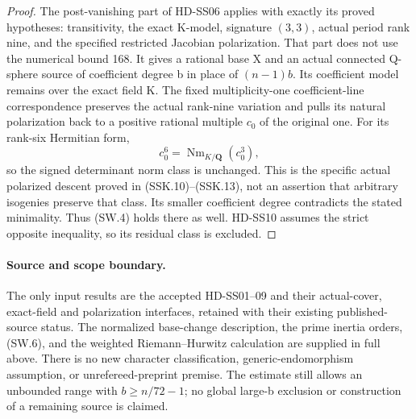 \begin{proof}
The post-vanishing part of HD-SS06 applies with exactly its proved
hypotheses: transitivity, the exact K-model, signature \((3,3)\),
actual period rank nine, and the specified restricted Jacobian
polarization.  That part does not use the numerical bound 168.
It gives a rational base X and an actual connected Q-sphere source
of coefficient degree b in place of \((n-1)b\).  Its coefficient
model remains over the exact field K.  The fixed multiplicity-one
coefficient-line correspondence preserves the actual rank-nine
variation and pulls its natural polarization back to a positive
rational multiple \(c_0\) of the original one.  For its rank-six
Hermitian form,
\[
                  c_0^6=\operatorname{Nm}_{K/\mathbf Q}(c_0^3),
 \tag{SW.9}
\]
so the signed determinant norm class is unchanged.  This is the
specific actual polarized descent proved in (SSK.10)--(SSK.13),
not an assertion that arbitrary isogenies preserve that class.
Its smaller coefficient degree contradicts the stated minimality.
Thus (SW.4) holds there as well.  HD-SS10 assumes the strict
opposite inequality, so its residual class is excluded.
\end{proof}

\paragraph{Source and scope boundary.}
The only input results are the accepted HD-SS01--09 and their
actual-cover, exact-field and polarization interfaces, retained with
their existing published-source status.  The normalized base-change
description, the prime inertia orders, (SW.6), and the weighted
Riemann--Hurwitz calculation are supplied in full above.  There is
no new character classification, generic-endomorphism assumption,
or unrefereed-preprint premise.  The estimate still allows an
unbounded range with \(b\ge n/72-1\); no global large-b exclusion
or construction of a remaining source is claimed.
